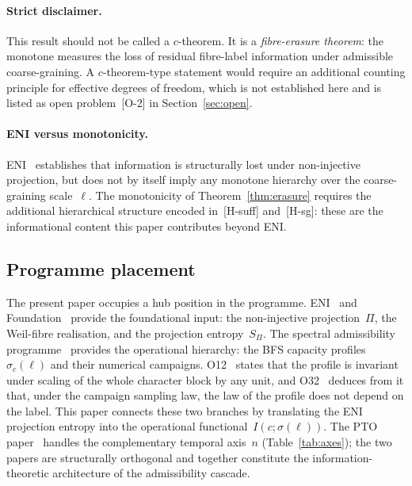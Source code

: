 \documentclass[11pt,a4paper]{article}
\theoremstyle{plain}
\theoremstyle{definition}
\theoremstyle{remark}
\begin{document}
      \paragraph{Strict disclaimer.}
        This result should not be called a $c$-theorem.
        It is a \emph{fibre-erasure theorem}:
        the monotone measures the loss of residual fibre-label information under
        admissible coarse-graining.
        A $c$-theorem-type statement would require an additional counting principle
        for effective degrees of freedom, which is not established here and is listed
        as open problem~\textup{[O-2]} in Section~\ref{sec:open}.

      \paragraph{ENI versus monotonicity.}
        ENI~\cite{Beau2026l} establishes that information is structurally lost under
        non-injective projection, but does not by itself imply any monotone hierarchy
        over the coarse-graining scale~$\ell$.
        The monotonicity of Theorem~\ref{thm:erasure} requires the additional
        hierarchical structure encoded in~\textup{[H-suff]} and~\textup{[H-sg]}:
        these are the informational content this paper contributes beyond ENI.

  \subsection{Programme placement}
    \label{sec:placement}

    The present paper occupies a hub position in the programme.
    ENI~\cite{Beau2026l} and Foundation~\cite{Beau2026m} provide the foundational input:
    the non-injective projection~$\Pi$, the Weil-fibre realisation,
    and the projection entropy~$S_\Pi$.
    The spectral admissibility programme~\cite{Beau2026a1note} provides the
    operational hierarchy: the BFS capacity profiles~$\sigma_c(\ell)$ and their
    numerical campaigns. O12~\cite{Beau2026a16} states that the profile is invariant under
    scaling of the whole character block by any unit, and O32~\cite{Beau2026a36} deduces from it
    that, under the campaign sampling law, the law of the profile does not depend on the label.
    This paper connects these two branches by translating the ENI projection
    entropy into the operational functional~$I(c;\sigma(\ell))$.
    The PTO paper~\cite{Beau2026pto} handles the complementary temporal axis~$n$
    (Table~\ref{tab:axes});
    the two papers are structurally orthogonal and together constitute
    the information-theoretic architecture of the admissibility cascade.
\end{document}
